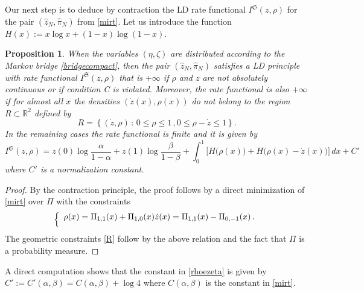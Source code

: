 \documentclass[reqno]{amsart}
\theoremstyle{plain}
\newtheorem{proposition}[theorem]{Proposition}
\theoremstyle{definition}
\theoremstyle{remark}
\numberwithin{equation}{section}
\numberwithin{theorem}{section}
\def\\{\par\medskip}
\renewcommand{\hat}{\widehat}
\newcommand{\<}{\langle}
\renewcommand{\>}{\rangle}
\begin{document}
	\smallskip
	Our next step is to deduce by contraction the LD rate functional $I^{\mathfrak S}(z,\rho)$ for the pair $(\hat z_N, \hat \pi_N)$ from \eqref{mirt}. Let us introduce the function $H(x):= x \log x+(1-x)\log(1-x)$.
	\begin{proposition}
		When the variables $(\eta,\zeta)$ are distributed according to the Markov bridge \eqref{bridgecompact}, then the pair $\left(\hat z_N,\hat{\pi}_N\right)$  satisfies a LD principle with rate functional $I^{\mathfrak S}(z,\rho)$ that is $+\infty$ if $\rho$ and $z$ are not absolutely continuous or if condition C is violated. Moreover, the rate functional is also $+\infty$ if for almost all $x$ the densities $(\dot z(x), \rho(x))$ do not belong to the region $R\subset \mathbb R^2$ defined by 
		\begin{equation}\label{R}
			R=\left\{(\dot z, \rho)\,:\, 0\leq \rho \leq 1\,, 0\leq \rho - \dot z \leq 1\right\}.
		\end{equation}
		In the remaining cases the rate functional is finite and it is given by
		\begin{equation}\label{rhoezeta}
			I^{\mathfrak S}(z,\rho)=z(0)\log\frac{\alpha}{1-\alpha}+z(1)\log\frac{\beta}{1-\beta}+\int_0^1 \Big[H\big(\rho(x)\big)+H\Big(\rho(x)-\dot{z}(x)\Big)\Big] \, dx +  C'
		\end{equation}
		where $C'$ is a normalization constant.
	\end{proposition}
	\begin{proof}
		By the contraction principle, the proof follows by a direct minimization of \eqref{mirt} over $\Pi$ with the constraints
		\begin{equation}
			\left\{
			\begin{array}{l}
				\rho(x)=\Pi_{1,1}(x)+\Pi_{1,0}(x)\\
				\dot z(x)=\Pi_{1,1}(x)-\Pi_{0,-1}(x)\,.
			\end{array}
			\right.
		\end{equation}
		The geometric constraints \eqref{R} follow by the above relation and the fact that $\Pi$ is a probability measure. 
	\end{proof}
	
	A direct computation shows that the constant in \eqref{rhoezeta} is given by $C':=C'(\alpha,\beta)=C(\alpha,\beta)+\log4$ where $C(\alpha,\beta)$ is the constant in \eqref{mirt}.
		
		\smallskip
	
\end{document}
